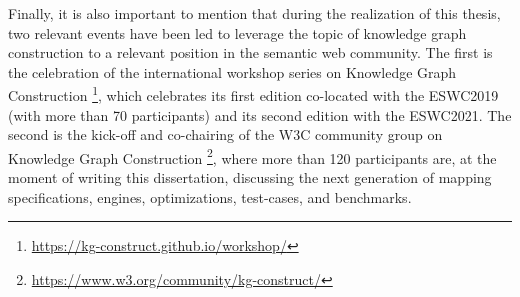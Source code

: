 Finally, it is also important to mention that during the realization of this thesis, two relevant events have been led to leverage the topic of knowledge graph construction to a relevant position in the semantic web community. The first is the celebration of the international workshop series on Knowledge Graph Construction \footnote{\url{https://kg-construct.github.io/workshop/}}, which celebrates its first edition co-located with the ESWC2019 (with more than 70 participants) and its second edition with the ESWC2021. The second is the kick-off and co-chairing of the W3C community group on Knowledge Graph Construction \footnote{\url{https://www.w3.org/community/kg-construct/}}, where more than 120 participants are, at the moment of writing this dissertation, discussing the next generation of mapping specifications, engines, optimizations, test-cases, and benchmarks. 